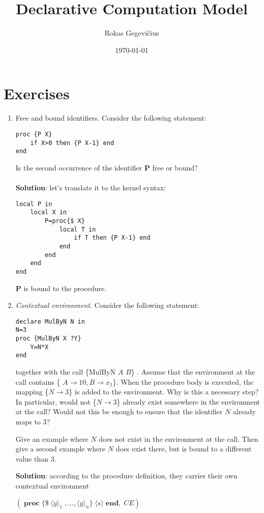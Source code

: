 \documentclass[11pt]{article}
\title{\textbf{Declarative Computation Model}}
\author{Rokas Gegevičius}
\date{\today}
\begin{document}
\maketitle
\thispagestyle{empty}

\section*{Exercises}
\begin{enumerate}

\item Free and bound identiﬁers. Consider the following statement:

\begin{verbatim}
proc {P X}
    if X>0 then {P X-1} end
end
\end{verbatim}
 
Is the second occurrence of the identiﬁer {\bfseries P} free or bound?
\\\\
{\bfseries Solution}: let's translate it to the kernel syntax:
\begin{verbatim}
local P in
    local X in
        P=proc{$ X}
            local T in
                if T then {P X-1} end
            end
        end
    end
end          
\end{verbatim}

{\bfseries P} is bound to the procedure.

\item {\itshape Contextual environment}. Consider the following statement:
\begin{verbatim}
declare MulByN N in
N=3
proc {MulByN X ?Y}
    Y=N*X
end
\end{verbatim}
together with the call \{MulByN $A$ $B$\} . Assume that the environment at the call
contains \{ $A \rightarrow 10, B\rightarrow x_1 $\}. When the procedure body is executed, the mapping \{$N\rightarrow3$\} is added to the environment. Why is this a necessary step? In particular, would
not \{$N\rightarrow3$\} already exist somewhere in the environment at the call? Would not this
be enough to ensure that the identiﬁer $N$ already maps to 3? 

Give an example where $N$ does not exist in the environment at the call. Then give a second example where
$N$ does exist there, but is bound to a diﬀerent value than 3.

{\bfseries Solution}: according to the procedure definition, they carrier their own contextual environment 

\( (\;\mathbf{proc} \; \{\$\; \langle y\rangle_1 \; ,..., \langle y\rangle_n\} \; \langle s\rangle \; \mathbf{end}, \; CE ) \;\)
 

\end{enumerate}
\end{document}
